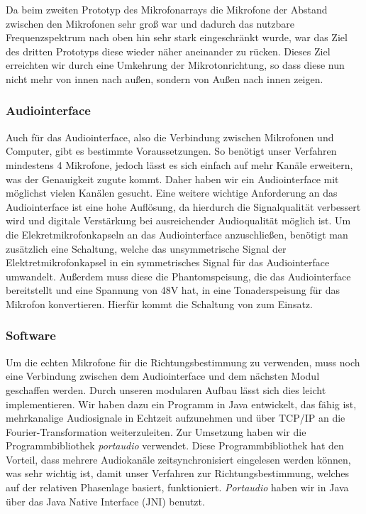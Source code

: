 Da beim zweiten Prototyp des Mikrofonarrays die Mikrofone der Abstand zwischen den Mikrofonen sehr groß war und dadurch das nutzbare Frequenzspektrum nach oben hin sehr stark eingeschränkt wurde, war das Ziel des dritten Prototyps diese wieder näher aneinander zu rücken. Dieses Ziel erreichten wir durch eine Umkehrung der Mikrotonrichtung, so dass diese nun nicht mehr von innen nach außen, sondern von Außen nach innen zeigen.
\subsubsection{Audiointerface}
Auch für das Audiointerface, also die Verbindung zwischen Mikrofonen und Computer, gibt es bestimmte Voraussetzungen. So benötigt unser Verfahren mindestens 4 Mikrofone, jedoch lässt es sich einfach auf mehr Kanäle erweitern, was der Genauigkeit zugute kommt. Daher haben wir ein Audiointerface mit möglichst vielen Kanälen gesucht. Eine weitere wichtige Anforderung an das Audiointerface ist eine hohe Auflösung, da hierdurch die Signalqualität verbessert wird und digitale Verstärkung bei ausreichender Audioqualität möglich ist. Um die Elekretmikrofonkapseln an das Audiointerface anzuschließen, benötigt man zusätzlich eine Schaltung, welche das unsymmetrische Signal der Elektretmikrofonkapsel in ein symmetrisches Signal für das Audiointerface umwandelt. Außerdem muss diese die Phantomspeisung, die das Audiointerface bereitstellt und eine Spannung von 48V hat, in eine Tonaderspeisung für das Mikrofon konvertieren. Hierfür kommt die Schaltung von \cite{Powering_microphones} zum Einsatz.

\subsubsection{Software}
Um die echten Mikrofone für die Richtungsbestimmung zu verwenden, muss noch eine Verbindung zwischen dem Audiointerface und dem nächsten Modul geschaffen werden. Durch unseren modularen Aufbau lässt sich dies leicht implementieren. Wir haben dazu ein Programm in Java entwickelt, das fähig ist, mehrkanalige Audiosignale in Echtzeit aufzunehmen und über TCP/IP an die Fourier-Transformation weiterzuleiten. Zur Umsetzung haben wir die Programmbibliothek \textit{portaudio} \cite{portaudio} verwendet. Diese Programmbibliothek hat den Vorteil, dass mehrere Audiokanäle zeitsynchronisiert eingelesen werden können, was sehr wichtig ist, damit unser Verfahren zur Richtungsbestimmung, welches auf der relativen Phasenlage basiert, funktioniert. \textit{Portaudio} haben wir in Java über das Java Native Interface (JNI) benutzt.

